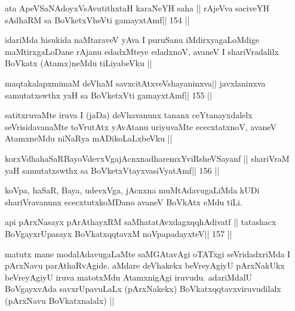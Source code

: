 \begin{shl}
ata ApeVSaNAdoyxV\s sAvutithxtaH karaNeYH saha ||
rAjeVva saciveYH sAdhaRM sa BoVketxVheVti gamayxtAmf\hfill || 154 ||
\end{shl}

\begin{artha}
idariMda hisukida naMtaraveV yAva I puruSanu iMdirxyagaLoMdige maMtirxgaLoDane rAjanu edadxMteye edadxnoV, avaneV I shariVradalilx BoVkatx (Atamx)neMdu tiLiyabeVku ||
\end{artha}

\begin{shl}
maqtakalapxmimaM deVhaM savxcitAtxveVshayaninxva\footnotemark[7] ||
javxlaninxva samutatxswthx yaH sa BoVketxVti gamayxtAmf\hfill || 155 ||
\end{shl}

\begin{artha}
satitxruvaMte iruva I (jaDa) deVhavanunx tananx ceYtanayxdalelx 
seVrisidavanaMte toVrutAtx yAvAtanu uriyuvaMte ececxtatxnoV, avaneV AtamxneMdu niNaRya mADikoLaLxbeVku ||
\end{artha}

\begin{shl}
korxVdhahaSaRBayoVdevxVgajAcnxnadharemxYviRsheVSayanf ||
shariVraM yaH samutatxswthx sa BoVketxVtayxvasiVyatAmf\hfill || 156 ||
\end{shl}

\begin{artha}
koVpa, haSaR, Baya, udevxVga, jAcnxna muMtAdavugaLiMda kUDi 
shariVravanunx ececxtutxkoMDano avaneV BoVkAtx eMdu tiLi.
\end{artha}


\begin{shl}
api pArxNasayx pArAthayxRM saMhatatAvxdagxqqhAdivatf ||
tatashacx BoVgayxrUpasayx BoVkatxqqtavxM noVpapadayxteV\hfill || 157 ||
\end{shl}

\begin{artha}
matutx mane modalAdavugaLaMte saMGAtavAgi oTATxgi seVridadxriMda I 
pArxNavu parAthaRvAgide. aMdare deVhakekx beVreyAgiyU pArxNakUkx 
beVreyAgiyU iruva matotxMdu AtamxnigAgi iruvudu. adariMdalU BoVgayxvAda savxrUpavuLaLx (pArxNakekx) BoVkatxqqtavxviruvudilalx (pArxNavu BoVkatxnalalx) ||
\end{artha}

